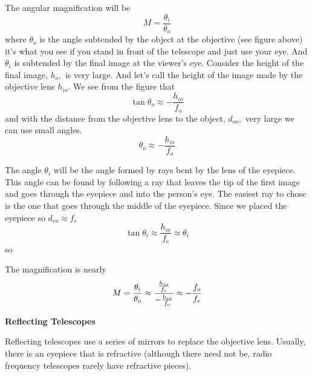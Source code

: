 \documentclass{article}
\begin{document}
The angular magnification will be 
\begin{equation}
M=\frac{\theta _{i}}{\theta _{o}}
\end{equation}%
where $\theta _{o}$ is the angle subtended by the object at the objective
(see figure above) it's what you see if you stand in front of the telescope
and just use your eye. And $\theta _{i}$ is subtended by the final image at
the viewer's eye. Consider the height of the final image, $h_{o},$ is very
large. And let's call the height of the image made by the objective lens $%
h_{io}.$ We see from the figure that 
\begin{equation}
\tan \theta _{o}\approx -\frac{h_{io}}{f_{o}}
\end{equation}%
and with the distance from the objective lens to the object, $d_{oo},$ very
large we can use small angles. 
\begin{equation}
\theta _{o}\approx -\frac{h_{io}}{f_{o}}
\end{equation}

The angle $\theta _{i}$ will be the angle formed by rays bent by the lens of
the eyepiece. This angle can be found by following a ray that leaves the tip
of the first image and goes through the eyepiece and into the person's eye.
The easiest ray to chose is the one that goes through the middle of the
eyepiece. Since we placed the eyepiece so $d_{eo}\approx f_{e}$ 
\begin{equation}
\tan \theta _{i}\approx \frac{h_{io}}{f_{e}}\approx \theta _{i}
\end{equation}%
so

The magnification is nearly%
\begin{equation}
M=\frac{\theta _{i}}{\theta _{o}}\approx \frac{\frac{h_{io}}{f_{e}}}{-\frac{%
h_{io}}{f_{o}}}\approx -\frac{f_{o}}{f_{e}}
\end{equation}

\textbf{Reflecting Telescopes}

Reflecting telescopes use a series of mirrors to replace the objective lens.
Usually, there is an eyepiece that is refractive (although there need not
be, radio frequency telescopes rarely have refractive pieces).
\end{document}
